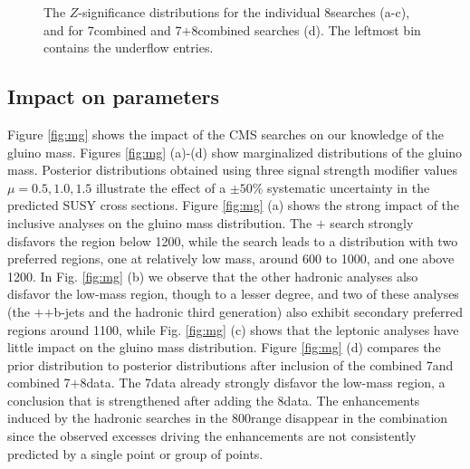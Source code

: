 
\begin{figure}[t]
\centering
{}
\vspace{1mm}
\caption{The $Z$-significance distributions for the individual 8\TeV searches (a-c), and for 7\TeV combined and 7$+$8\TeV combined searches (d). The leftmost bin contains the underflow entries.}
\label{fig:Z}
\end{figure}

\subsection{Impact on parameters}
Figure \ref{fig:mg} shows the impact of the CMS searches on our
knowledge of the gluino mass. Figures \ref{fig:mg} (a)-(d) show marginalized
distributions of the gluino mass.  Posterior distributions obtained
using three  signal strength modifier values $\mu = 0.5, 1.0, 1.5$
illustrate the effect of a $\pm50$\% systematic uncertainty in the
predicted SUSY cross sections.  Figure \ref{fig:mg} (a) shows the strong impact of
the inclusive analyses on the gluino mass distribution.  The
\HT{}$+$\MHT{} search strongly disfavors the region below 1200\GeV,
while the \MTtwo{} search leads to a distribution with two preferred
regions, one at relatively low mass, around 600 to 1000\GeV, and one
above 1200\GeV.  In Fig. \ref{fig:mg} (b) we observe that the other hadronic
analyses also disfavor the low-mass region, though to a lesser degree,
 and two of these analyses (the \HT{}$+$\MET{}$+$b-jets and the
 hadronic third generation) also exhibit secondary
 preferred regions around 1100\GeV, while Fig. \ref{fig:mg} (c) shows that the leptonic
 analyses have little impact on the gluino mass distribution.
Figure \ref{fig:mg} (d) compares the  prior distribution to posterior distributions after inclusion of the combined 7\TeV and combined 7$+$8\TeV data.  The 7\TeV data already strongly disfavor the low-mass region, a conclusion that is strengthened 
after adding the 8\TeV data.  The enhancements induced by the hadronic
searches in the 800\GeV range disappear in the combination
since the observed excesses driving the enhancements are not
consistently predicted by a single point or group of points.


